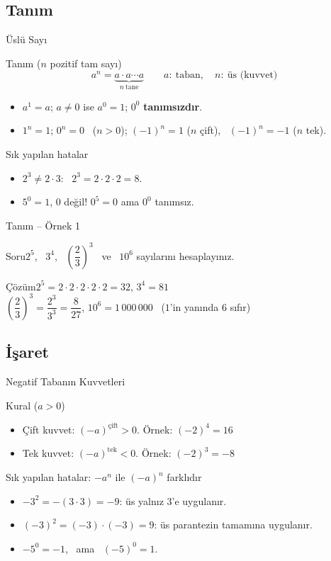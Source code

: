 \documentclass[aspectratio=169,11pt,handout]{beamer}
\newcommand{\soru}[3]{%
\begin{frame}{#1}
  \begin{block}{Soru}\large #2\end{block}
  \pause
  \begin{exampleblock}{Çözüm}\large #3\end{exampleblock}
\end{frame}}
\begin{document}
\subsection{Tanım}
\begin{frame}{Üslü Sayı}
\begin{block}{Tanım (\(n\) pozitif tam sayı)}
\[a^n=\underbrace{a\cdot a\cdots a}_{n\ \text{tane}}\qquad a:\ \text{taban},\quad n:\ \text{üs (kuvvet)}\]
\begin{itemize}
\item \(a^1=a\); \quad \(a\neq 0\) ise \(a^0=1\); \quad \(0^0\) \textbf{tanımsızdır}.
\item \(1^n=1\); \quad \(0^n=0\) \ (\(n>0\)); \quad \((-1)^n=1\) (\(n\) çift), \ \((-1)^n=-1\) (\(n\) tek).
\end{itemize}
\end{block}
\begin{alertblock}{Sık yapılan hatalar}
\begin{itemize}
\item \(2^3\neq 2\cdot 3\): \ \(2^3=2\cdot 2\cdot 2=8\).
\item \(5^0=1\), \(0\) değil! \quad \(0^5=0\) ama \(0^0\) tanımsız.
\end{itemize}
\end{alertblock}
\end{frame}

\soru{Tanım -- Örnek 1}
{\(2^5\), \ \(3^4\), \ \(\left(\dfrac23\right)^3\) \ ve \ \(10^6\) sayılarını hesaplayınız.}
{\(2^5=2\cdot2\cdot2\cdot2\cdot2=32\), \qquad \(3^4=81\)\\[4pt]
\(\left(\dfrac23\right)^3=\dfrac{2^3}{3^3}=\dfrac{8}{27}\), \qquad \(10^6=1\,000\,000\) \ (\(1\)'in yanında \(6\) sıfır)}

\subsection{İşaret}
\begin{frame}{Negatif Tabanın Kuvvetleri}
\begin{block}{Kural (\(a>0\))}
\begin{itemize}
\item Çift kuvvet: \((-a)^{\text{çift}}>0\). \quad Örnek: \((-2)^4=16\)
\item Tek kuvvet: \((-a)^{\text{tek}}<0\). \quad Örnek: \((-2)^3=-8\)
\end{itemize}
\end{block}
\begin{alertblock}{Sık yapılan hatalar: \(-a^n\) ile \((-a)^n\) farklıdır}
\begin{itemize}
\item \(-3^2=-(3\cdot 3)=-9\): üs yalnız \(3\)'e uygulanır.
\item \((-3)^2=(-3)\cdot(-3)=9\): üs parantezin tamamına uygulanır.
\item \(-5^0=-1\), \ ama \ \((-5)^0=1\).
\end{itemize}
\end{alertblock}
\end{frame}
\end{document}
